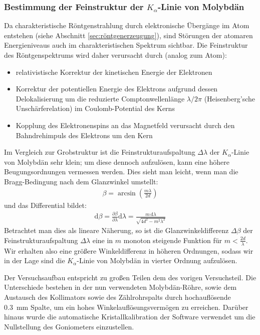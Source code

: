\documentclass[11pt, a4paper]{article}
\begin{document}
\subsubsection{Bestimmung der Feinstruktur der $K_\alpha$-Linie von Molybdän}
Da charakteristische Röntgenstrahlung durch elektronische Übergänge im Atom entstehen (siehe Abschnitt \ref{sec:röntgenerzeugung}), sind Störungen der atomaren Energieniveaus auch im charakteristischen Spektrum sichtbar.
Die Feinstruktur des Röntgenspektrums wird daher verursacht durch (analog zum Atom):
\begin{itemize}
  \item relativistische Korrektur der kinetischen Energie der Elektronen
  
  \item Korrektur der potentiellen Energie des Elektrons aufgrund dessen Delokalisierung um die reduzierte Comptonwellenlänge $\lambda / 2\pi$ (Heisenberg'sche Unschärferelation) im Coulomb-Potential des Kerns
  
  \item Kopplung des Elektronenspins an das Magnetfeld verursacht durch den Bahndrehimpuls des Elektrons um den Kern
\end{itemize}
Im Vergleich zur Grobstruktur ist die Feinstrukturaufspaltung $\Delta \lambda$ der $K_\alpha$-Linie von Molybdän sehr klein; um diese dennoch aufzulösen, kann eine höhere Beugungsordnungen vermessen werden.
Dies sieht man leicht, wenn man die Bragg-Bedingung nach dem Glanzwinkel umstellt:
\begin{align}
  \beta = \arcsin \left( \frac{m \lambda}{2 d} \right)
\end{align}
und das Differential bildet:
\begin{align}
  \mathrm{d}\beta = \frac{\partial \beta}{\partial \lambda} \mathrm{d}\lambda = \frac{m\, \mathrm{d}\lambda}{\sqrt{4 d^2 - m^2 \lambda^2}}
\end{align}
Betrachtet man dies als lineare Näherung, so ist die Glanzwinkeldifferenz $\Delta \beta$ der Feinstrukturaufspaltung $\Delta \lambda$ eine in $m$ monoton steigende Funktion für $m < \frac{2d}{\lambda}$.
Wir erhalten also eine größere Winkeldifferenz in höheren Ordnungen, sodass wir in der Lage sind die $K_\alpha$-Linie von Molybdän in vierter Ordnung aufzulösen.

Der Versuchsaufbau entspricht zu großen Teilen dem des vorigen Versuchsteil.
Die Unterschiede bestehen in der nun verwendeten Molybdän-Röhre, sowie dem Austausch des Kollimators sowie des Zählrohrspalts durch hochauflösende \SI{0,3}{\milli\metre} Spalte, um ein hohes Winkelauflösungsvermögen zu erreichen.
Darüber hinaus wurde die automatische Kristallkalibration der Software verwendet um die Nullstellung des Goniometers einzustellen.
\end{document}
